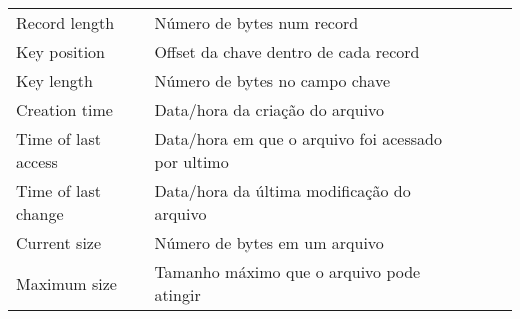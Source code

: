 \documentclass[10pt]{article}
\begin{document}
\begin{itemize}
\begin{table}[!h]
\begin{tabular}{lllll}
        Record length           & Número de bytes num record                               &  &  &  \\
        Key position            & Offset da chave dentro de cada record                    &  &  &  \\
        Key length              & Número de bytes no campo chave                           &  &  &  \\
        Creation time           & Data/hora da criação do arquivo                          &  &  &  \\
        Time of last access     & Data/hora em que o arquivo foi acessado por ultimo       &  &  &  \\
        Time of last change     & Data/hora da última modificação do arquivo               &  &  &  \\
        Current size            & Número de bytes em um arquivo                            &  &  &  \\
        Maximum size            & Tamanho máximo que o arquivo pode atingir                &  &  &  \\
        \end{tabular}
    \end{table}
    \

\end{itemize}
\end{document}
